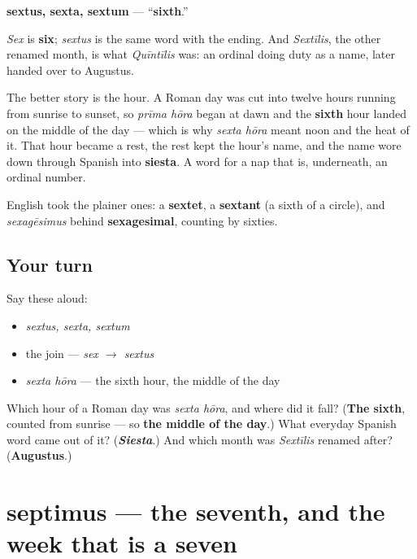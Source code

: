\begin{cousinweb}
\textbf{sextus, sexta, sextum} — \textquotedblleft{}\textbf{sixth}.\textquotedblright{}

\emph{Sex} is \textbf{six}; \emph{sextus} is the same word with the ending. And \emph{Sextīlis}, the other renamed month, is what \emph{Quīntīlis} was: an ordinal doing duty as a name, later handed over to Augustus.

The better story is the hour. A Roman day was cut into twelve hours running from sunrise to sunset, so \emph{prīma hōra} began at dawn and the \textbf{sixth} hour landed on the middle of the day — which is why \emph{sexta hōra} meant noon and the heat of it. That hour became a rest, the rest kept the hour's name, and the name wore down through Spanish into \textbf{siesta}. A word for a nap that is, underneath, an ordinal number.

English took the plainer ones: a \textbf{sextet}, a \textbf{sextant} (a sixth of a circle), and \emph{sexagēsimus} behind \textbf{sexagesimal}, counting by sixties.
\end{cousinweb}

\subsection*{Your turn}
Say these aloud:

\begin{itemize}
\raggedright
  \item \emph{sextus, sexta, sextum}
  \item the join — \emph{sex $\to$ sextus}
  \item \emph{sexta hōra} — the sixth hour, the middle of the day
\end{itemize}

\begin{tcolorbox}[breakable,colback=teal!4,colframe=teal!35!black,title={Before you move on}]
Which hour of a Roman day was \emph{sexta hōra}, and where did it fall? (\textbf{The sixth}, counted from sunrise — so \textbf{the middle of the day}.) What everyday Spanish word came out of it? (\emph{\textbf{Siesta}}.) And which month was \emph{Sextīlis} renamed after? (\textbf{Augustus}.)
\end{tcolorbox}
\section[septimus, septima, septimum]{septimus — the seventh, and the week that is a seven}

